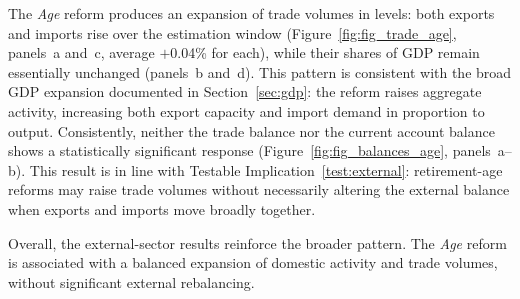 \documentclass[11pt,english,a4paper, twoside, authoryear]{article}
\begin{document}
The \textit{Age} reform produces an expansion of trade volumes in levels: both exports and imports rise over the estimation window (Figure~\ref{fig:fig_trade_age}, panels~a and~c, average $+$0.04\% for each), while their shares of GDP remain essentially unchanged (panels~b and~d). This pattern is consistent with the broad GDP expansion documented in Section~\ref{sec:gdp}: the reform raises aggregate activity, increasing both export capacity and import demand in proportion to output. Consistently, neither the trade balance nor the current account balance shows a statistically significant response (Figure~\ref{fig:fig_balances_age}, panels~a--b). This result is in line with Testable Implication~\ref{test:external}: retirement-age reforms may raise trade volumes without necessarily altering the external balance when exports and imports move broadly together.


Overall, the external-sector results reinforce the broader pattern. The \textit{Age} reform is associated with a balanced expansion of domestic activity and trade volumes, without significant external rebalancing. 
\end{document}
